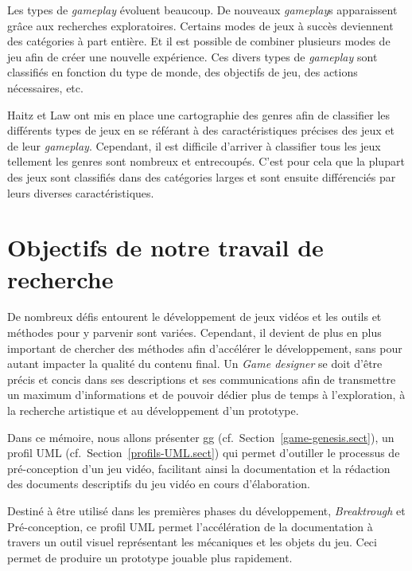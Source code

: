 Les types de \emph{gameplay} évoluent beaucoup.
De nouveaux \emph{gameplay}s apparaissent grâce aux recherches exploratoires.
Certains modes de jeux à succès deviennent des catégories à part entière.
Et il est possible de combiner plusieurs modes de jeu afin de créer une nouvelle expérience.
Ces divers types de \emph{gameplay} sont classifiés en fonction du type de monde, des objectifs de jeu, des actions nécessaires, etc. 

Haitz et Law \cite{HeintzStephanie2015TGGM} ont mis en place une cartographie des genres afin de classifier les différents types de jeux en se référant à des caractéristiques précises des jeux et de leur \emph{gameplay}.
Cependant, il est difficile d'arriver à classifier tous les jeux tellement les genres sont nombreux et entrecoupés.
C'est pour cela que la plupart des jeux sont classifiés dans des catégories larges et sont ensuite différenciés par leurs diverses caractéristiques.



\section{Objectifs de notre travail de recherche}


De nombreux défis entourent le développement de jeux vidéos et les outils et méthodes pour y parvenir sont variées.
Cependant, il devient de plus en plus important de chercher des méthodes afin d'accélérer le développement, sans pour autant impacter la qualité du contenu final.
Un \emph{Game designer} se doit d'être précis et concis dans ses descriptions et ses communications afin de transmettre un maximum d'informations et de pouvoir dédier plus de temps à l'exploration, à la recherche artistique et au développement d'un prototype. 



Dans ce mémoire, nous allons présenter \gls{gg} (cf.~Section~\ref{game-genesis.sect}), un profil UML (cf.~Section~\ref{profils-UML.sect}) qui permet d'outiller le processus de pré-conception d'un jeu vidéo, facilitant ainsi la documentation et la rédaction des documents descriptifs du jeu vidéo en cours d'élaboration.

Destiné à être utilisé dans les premières phases du développement, \emph{Breaktrough} et Pré-conception, ce profil UML permet l'accélération de la documentation à travers un outil visuel représentant les mécaniques et les objets du jeu.
Ceci permet de produire un prototype jouable plus rapidement.

